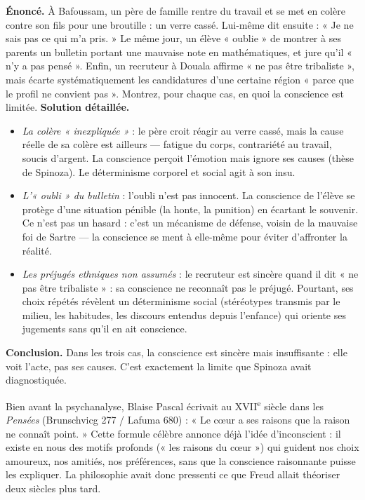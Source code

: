 \documentclass[11pt]{article}
\begin{document}
\begin{exoresolu}
\textbf{Énoncé.} À Bafoussam, un père de famille rentre du travail et se met en colère contre son fils pour une broutille : un verre cassé. Lui-même dit ensuite : « Je ne sais pas ce qui m'a pris. » Le même jour, un élève « oublie » de montrer à ses parents un bulletin portant une mauvaise note en mathématiques, et jure qu'il « n'y a pas pensé ». Enfin, un recruteur à Douala affirme « ne pas être tribaliste », mais écarte systématiquement les candidatures d'une certaine région « parce que le profil ne convient pas ». Montrez, pour chaque cas, en quoi la conscience est limitée.
\tcblower
\textbf{Solution détaillée.}
\begin{itemize}
\item \emph{La colère « inexpliquée »} : le père croit réagir au verre cassé, mais la cause réelle de sa colère est ailleurs — fatigue du corps, contrariété au travail, soucis d'argent. La conscience perçoit l'émotion mais ignore ses causes (thèse de Spinoza). Le déterminisme corporel et social agit à son insu.
\item \emph{L'« oubli » du bulletin} : l'oubli n'est pas innocent. La conscience de l'élève se protège d'une situation pénible (la honte, la punition) en écartant le souvenir. Ce n'est pas un hasard : c'est un mécanisme de défense, voisin de la mauvaise foi de Sartre — la conscience se ment à elle-même pour éviter d'affronter la réalité.
\item \emph{Les préjugés ethniques non assumés} : le recruteur est sincère quand il dit « ne pas être tribaliste » : sa conscience ne reconnaît pas le préjugé. Pourtant, ses choix répétés révèlent un déterminisme social (stéréotypes transmis par le milieu, les habitudes, les discours entendus depuis l'enfance) qui oriente ses jugements sans qu'il en ait conscience.
\end{itemize}
\textbf{Conclusion.} Dans les trois cas, la conscience est sincère mais insuffisante : elle voit l'acte, pas ses causes. C'est exactement la limite que Spinoza avait diagnostiquée.
\end{exoresolu}

\begin{savaistu}
Bien avant la psychanalyse, Blaise Pascal écrivait au XVII\textsuperscript{e} siècle dans les \emph{Pensées} (Brunschvicg 277 / Lafuma 680) : « Le cœur a ses raisons que la raison ne connaît point. » Cette formule célèbre annonce déjà l'idée d'inconscient : il existe en nous des motifs profonds (« les raisons du cœur ») qui guident nos choix amoureux, nos amitiés, nos préférences, sans que la conscience raisonnante puisse les expliquer. La philosophie avait donc pressenti ce que Freud allait théoriser deux siècles plus tard.
\end{savaistu}
\end{document}
